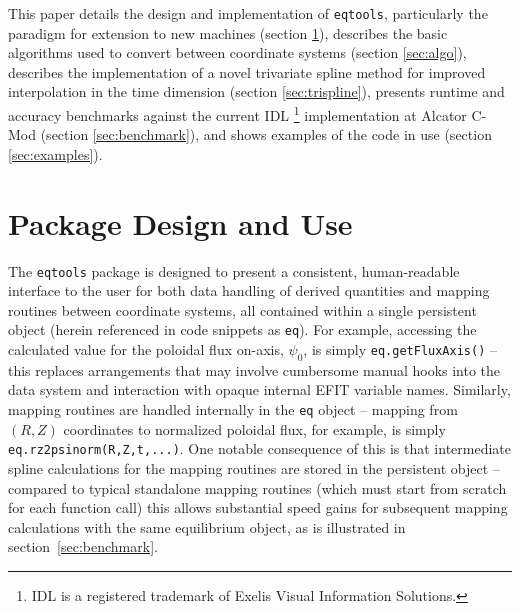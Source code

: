 \documentclass[12pt,floatfix,showpacs]{revtex4-1}
\newcommand{\eqtools}{\texttt{eqtools}\xspace}
\begin{document}
This paper details the design and implementation of \eqtools, particularly the paradigm for extension to new machines (section \ref{sec:design}), describes the basic algorithms used to convert between coordinate systems (section \ref{sec:algo}), describes the implementation of a novel trivariate spline method for improved interpolation in the time dimension (section \ref{sec:trispline}), presents runtime and accuracy benchmarks against the current IDL \footnote{IDL is a registered trademark of Exelis Visual Information Solutions.} implementation at Alcator C-Mod (section \ref{sec:benchmark}), and shows examples of the code in use (section \ref{sec:examples}).

\section{Package Design and Use}\label{sec:design}

The \eqtools package is designed to present a consistent, human-readable interface to the user for both data handling of derived quantities and mapping routines between coordinate systems, all contained within a single persistent object (herein referenced in code snippets as \verb|eq|).
For example, accessing the calculated value for the poloidal flux on-axis, $\psi_0$, is simply \verb|eq.getFluxAxis()| -- this replaces arrangements that may involve cumbersome manual hooks into the data system and interaction with opaque internal EFIT variable names.
Similarly, mapping routines are handled internally in the \verb|eq| object -- mapping from $(R, Z)$ coordinates to normalized poloidal flux, for example, is simply \verb|eq.rz2psinorm(R,Z,t,...)|.  
One notable consequence of this is that intermediate spline calculations for the mapping routines are stored in the persistent object -- compared to typical standalone mapping routines (which must start from scratch for each function call) this allows substantial speed gains for subsequent mapping calculations with the same equilibrium object, as is illustrated in section~\ref{sec:benchmark}.
\end{document}
